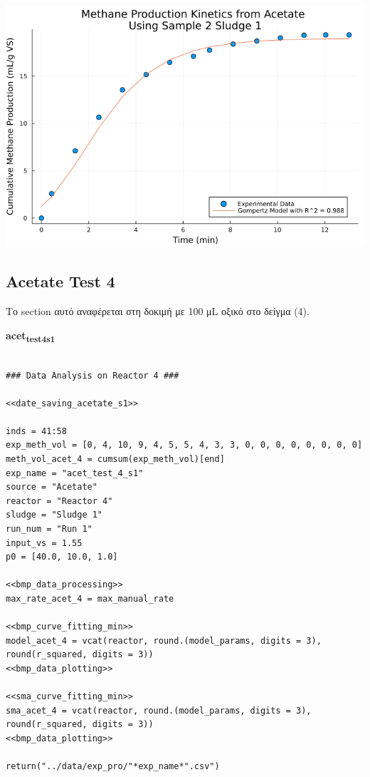 \documentclass[11pt]{article}
\begin{document}
\begin{center}
\includegraphics[width=.9\linewidth]{../plots/BMPs/Acetate/specific_methane_kinetics_acet_test_2_s1.png}
\end{center}

\subsection{Acetate Test 4}
\label{sec:org40ebdda}
Το section αυτό αναφέρεται στη δοκιμή με 100 μL οξικό στο δείγμα (4).

\textbf{acet\textsubscript{test}\textsubscript{4}\textsubscript{s1}}
\begin{verbatim}

### Data Analysis on Reactor 4 ###

<<date_saving_acetate_s1>>

inds = 41:58
exp_meth_vol = [0, 4, 10, 9, 4, 5, 5, 4, 3, 3, 0, 0, 0, 0, 0, 0, 0, 0]
meth_vol_acet_4 = cumsum(exp_meth_vol)[end]
exp_name = "acet_test_4_s1"
source = "Acetate"
reactor = "Reactor 4"
sludge = "Sludge 1"
run_num = "Run 1"
input_vs = 1.55
p0 = [40.0, 10.0, 1.0]

<<bmp_data_processing>>
max_rate_acet_4 = max_manual_rate

<<bmp_curve_fitting_min>>
model_acet_4 = vcat(reactor, round.(model_params, digits = 3), round(r_squared, digits = 3))
<<bmp_data_plotting>>

<<sma_curve_fitting_min>>
sma_acet_4 = vcat(reactor, round.(model_params, digits = 3), round(r_squared, digits = 3))
<<bmp_data_plotting>>

return("../data/exp_pro/"*exp_name*".csv")
\end{verbatim}
\end{document}
